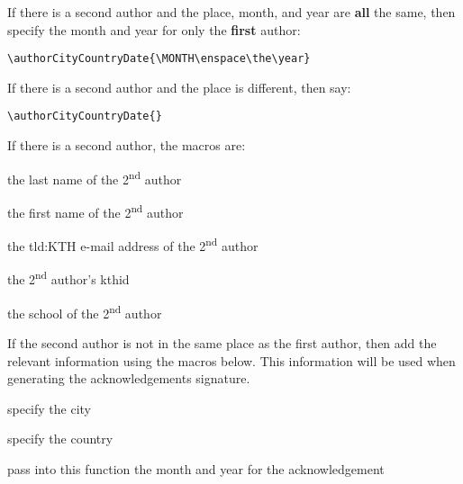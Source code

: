 If there is a second author and the place, month, and year are \textbf{all} the same, then specify the month and year for only the \textbf{first} author:
\begin{lstlisting}
\authorCityCountryDate{\MONTH\enspace\the\year}
\end{lstlisting}

If there is a second author and the place is different, then say:
\begin{lstlisting}
\authorCityCountryDate{}
\end{lstlisting}

If there is a second author, the macros are:
\begin{description}[leftmargin=!, labelwidth =\widthof{\texttt{\textbackslash secondAuthorsFirstname\{\}}}]
\item [\texttt{\textbackslash secondAuthorsLastname\{\}}] the last name of the 2\textsuperscript{nd} author
\item [\texttt{\textbackslash secondAuthorsFirstname\{\}}] the first name of the 2\textsuperscript{nd} author
\item [\texttt{\textbackslash secondemail\{\}}] the \gls{tld:KTH} e-mail address of the 2\textsuperscript{nd} author
\item [\texttt{\textbackslash secondkthid\{\}}] the 2\textsuperscript{nd} author's kthid
\item [\texttt{\textbackslash secondAuthorsSchool\{\}}] the school of the 2\textsuperscript{nd} author
\end{description}

If the second author is not in the same place as the first author, then add the relevant information using the macros below.  This information will be used when generating the acknowledgements signature.
\begin{description}[leftmargin=!, labelwidth =\widthof{\texttt{\textbackslash secondAuthorsFirstname\{\}}}]
\item [\texttt{\textbackslash secondAuthorCity\{A City\}}]  specify the city

\item [\texttt{\textbackslash secondAuthorCountry\{A Country\}}] specify the country

\item [\texttt{\textbackslash secondAuthorCityCountryDate\{\textbackslash MONTH\textbackslash enspace\textbackslash the\textbackslash year\}}]  pass into this function the month and year for the acknowledgement
\end{description}

